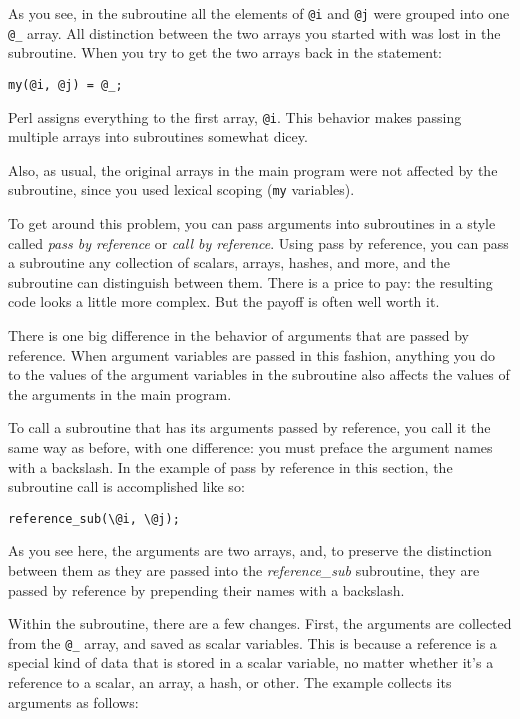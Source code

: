 As you see, in the subroutine all the elements of \verb|@i| and \verb|@j| were grouped into one \verb|@_| array. All distinction between the two arrays you started with was lost in the subroutine. When you try to get the two arrays back in the statement:

\begin{lstlisting}
my(@i, @j) = @_;
\end{lstlisting}

Perl assigns everything to the first array, \verb|@i|. This behavior makes passing multiple arrays into subroutines somewhat dicey. 

Also, as usual, the original arrays in the main program were not affected by the subroutine, since you used lexical scoping (\verb|my| variables).

To get around this problem, you can pass arguments into subroutines in a style called \textit{pass by reference} or \textit{call by reference}. Using pass by reference, you can pass a subroutine any collection of scalars, arrays, hashes, and more, and the subroutine can distinguish between them. There is a price to pay: the resulting code looks a little more complex. But the payoff is often well worth it.

There is one big difference in the behavior of arguments that are passed by reference. When argument variables are passed in this fashion, anything you do to the values of the argument variables in the subroutine also affects the values of the arguments in the main program.

To call a subroutine that has its arguments passed by reference, you call it the same way as before, with one difference: you must preface the argument names with a backslash. In the example of pass by reference in this section, the subroutine call is accomplished like so:

\begin{lstlisting}
reference_sub(\@i, \@j);
\end{lstlisting}

As you see here, the arguments are two arrays, and, to preserve the distinction between them as they are passed into the \textit{reference\_sub} subroutine, they are passed by reference by prepending their names with a backslash.

Within the subroutine, there are a few changes. First, the arguments are collected from the \verb|@_| array, and saved as scalar variables. This is because a reference is a special kind of data that is stored in a scalar variable, no matter whether it's a reference to a scalar, an array, a hash, or other. The example collects its arguments as follows:

